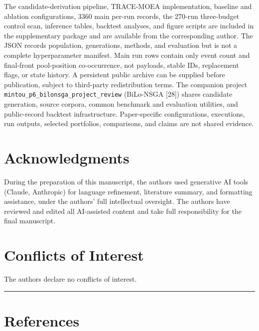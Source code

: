\documentclass[
  10pt,
  a4paper,
]{article}
\begin{document}
The candidate-derivation pipeline, TRACE-MOEA implementation, baseline
and ablation configurations, 3360 main per-run records, the 270-run
three-budget control scan, inference tables, backtest analyses, and
figure scripts are included in the supplementary package and are
available from the corresponding author. The JSON records population,
generations, methods, and evaluation but is not a complete
hyperparameter manifest. Main run rows contain only event count and
final-front pool-position co-occurrence, not payloads, stable IDs,
replacement flags, or state history. A persistent public archive can be
supplied before publication, subject to third-party redistribution
terms. The companion project
\texttt{mintou\_p6\_bilonsga\_project\_review} (BiLo-NSGA {[}28{]})
shares candidate generation, source corpora, common benchmark and
evaluation utilities, and public-record backtest infrastructure.
Paper-specific configurations, executions, run outputs, selected
portfolios, comparisons, and claims are not shared evidence.

\section{Acknowledgments}\label{acknowledgments}

During the preparation of this manuscript, the authors used generative
AI tools (Claude, Anthropic) for language refinement, literature
summary, and formatting assistance, under the authors' full intellectual
oversight. The authors have reviewed and edited all AI-assisted content
and take full responsibility for the final manuscript.

\section{Conflicts of Interest}\label{conflicts-of-interest}

The authors declare no conflicts of interest.

\begin{center}\rule{0.5\linewidth}{0.5pt}\end{center}

\section{References}\label{references}
\end{document}
